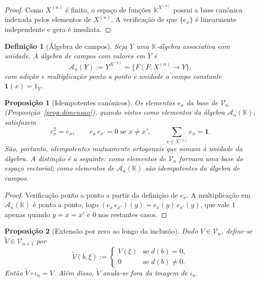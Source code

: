 \documentclass[11pt,a4paper]{article}
\newtheorem{definicao}{Definição}
\newtheorem{proposicao}{Proposição}
\begin{document}
\begin{proof}
Como \(X^{(n)}\) é finito, o espaço de funções \(\mathbb K^{X^{(n)}}\)
possui a base canónica indexada pelos elementos de \(X^{(n)}\).
A verificação de que \(\{e_x\}\) é linearmente independente e gera é
imediata.
\end{proof}

\begin{definicao}[Álgebra de campos]
\label{def:algebra-campos}
Seja \(Y\) uma \(\mathbb K\)-álgebra associativa com unidade.
A álgebra de campos com valores em \(Y\) é
\[
\mathcal A_n(Y) := Y^{X^{(n)}}
= \{F\mid F\colon X^{(n)}\to Y\},
\]
com adição e multiplicação ponto a ponto e unidade o campo constante
\(\mathbf 1(x)=1_Y\).
\end{definicao}

\begin{proposicao}[Idempotentes canónicos]
\label{prop:idempotentes}
Os elementos \(e_x\) da base de \(\mathcal V_n\) (Proposição~\ref{prop:dimensao}),
quando vistos como elementos da álgebra \(\mathcal A_n(\mathbb K)\),
satisfazem
\[
e_x^2 = e_x,
\qquad
e_x\, e_{x'} = 0 \text{ se } x\neq x',
\qquad
\sum_{x\in X^{(n)}} e_x = \mathbf 1.
\]
São, portanto, idempotentes mutuamente ortogonais que somam à unidade da
álgebra.
A distinção é a seguinte: como elementos de \(\mathcal V_n\) formam uma
base do espaço vectorial; como elementos de \(\mathcal A_n(\mathbb K)\)
são idempotentes da álgebra de campos.
\end{proposicao}

\begin{proof}
Verificação ponto a ponto a partir da definição de \(e_x\).
A multiplicação em \(\mathcal A_n(\mathbb K)\) é ponto a ponto, logo
\((e_x\, e_{x'})(y)=e_x(y)\,e_{x'}(y)\), que vale \(1\) apenas quando
\(y=x=x'\) e \(0\) nos restantes casos.
\end{proof}

\begin{proposicao}[Extensão por zero ao longo da inclusão]
\label{prop:extensao-zero}
Dado \(V\in\mathcal V_n\), define-se \(\widetilde V\in\mathcal V_{n+1}\) por
\[
\widetilde V(b,\xi) :=
\begin{cases}
V(\xi) & \text{se } d(b)=0,\\
0 & \text{se } d(b)\neq 0.
\end{cases}
\]
Então \(\widetilde V\circ\iota_n = V\).
Além disso, \(\widetilde V\) anula-se fora da imagem de \(\iota_n\).
\end{proposicao}
\end{document}
